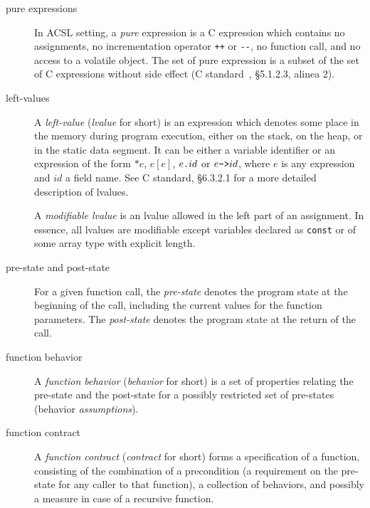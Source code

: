 \documentclass[a4paper,11pt,twoside,openright]{report}
\begin{document}
\begin{description}
\item[pure expressions]  In ACSL setting, a
  \emph{pure} expression is a C expression which contains no assignments, no
  incrementation operator \verb|++| or \verb|--|, no function call,
  and no access to a volatile object. The set of pure expression is a
  subset of the set of C expressions without side effect (C
  standard~\cite{KR88,standardc99}, \S 5.1.2.3, alinea 2).

\item[left-values] 

  A \emph{left-value} (\emph{lvalue} for short) is an expression which
  denotes some place in the memory during program execution, either on
  the stack, on the heap, or in the static data segment. It can be
  either a variable identifier or an expression of the form $*e$,
  $e[e]$, $e\verb|.|id$ or $e\verb|->|id$, where $e$ is any expression
  and $id$ a field name. See C standard, \S 6.3.2.1 for a more
  detailed description of lvalues.

  A \emph{modifiable lvalue} is an lvalue allowed in the left part of
  an assignment. In essence, all lvalues are modifiable except
  variables declared as \texttt{const} or of some array type with
  explicit length.



\item[pre-state and post-state]

    For a given function call, the \emph{pre-state} denotes the
    program state at the beginning of the call, including the
    current values for the function parameters. The \emph{post-state}
    denotes the program state at the return of the call.

\item[function behavior]  

  A \emph{function behavior} (\emph{behavior} for short) is a set of
  properties relating the pre-state and the post-state for a
  possibly restricted set of pre-states (behavior \emph{assumptions}).

\item[function contract]  

  A \emph{function contract} (\emph{contract} for short) forms a
  specification of a function, consisting of the combination of a
  precondition (a requirement on the pre-state for any caller to that
  function), a collection of behaviors, and possibly a measure in case
  of a recursive function.

\end{description}
\end{document}
